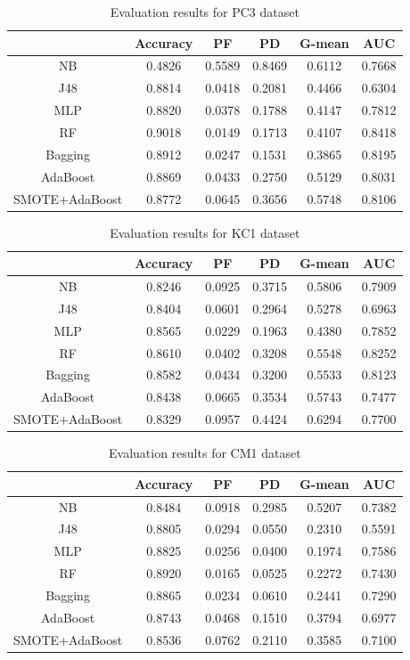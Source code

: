 \documentclass[runningheads,a4paper]{llncs}
\begin{document}
\begin{table}


\caption{Evaluation results for PC3 dataset}


\begin{centering}
\begin{tabular}{|c|c|c|c|c|c|}
\hline 
 & Accuracy & PF & PD & G-mean & AUC\tabularnewline
\hline 
\hline 
NB & 0.4826 & 0.5589 & 0.8469 & 0.6112 & 0.7668\tabularnewline
\hline 
J48 & 0.8814 & 0.0418 & 0.2081 & 0.4466 & 0.6304\tabularnewline
\hline 
MLP & 0.8820 & 0.0378 & 0.1788 & 0.4147 & 0.7812\tabularnewline
\hline 
RF & 0.9018 & 0.0149 & 0.1713 & 0.4107 & 0.8418\tabularnewline
\hline 
Bagging & 0.8912 & 0.0247 & 0.1531 & 0.3865 & 0.8195\tabularnewline
\hline 
AdaBoost & 0.8869 & 0.0433 & 0.2750 & 0.5129 & 0.8031\tabularnewline
\hline 
SMOTE+AdaBoost & 0.8772 & 0.0645 & 0.3656 & 0.5748 & 0.8106\tabularnewline
\hline 
\end{tabular}
\par\end{centering}
\end{table}


\begin{table}
\caption{Evaluation results for KC1 dataset}
\begin{centering}
\begin{tabular}{|c|c|c|c|c|c|}
\hline 
 & Accuracy & PF & PD & G-mean & AUC\tabularnewline
\hline 
\hline 
NB & 0.8246 & 0.0925 & 0.3715 & 0.5806 & 0.7909\tabularnewline
\hline 
J48 & 0.8404 & 0.0601 & 0.2964 & 0.5278 & 0.6963\tabularnewline
\hline 
MLP & 0.8565 & 0.0229 & 0.1963 & 0.4380 & 0.7852\tabularnewline
\hline 
RF & 0.8610 & 0.0402 & 0.3208 & 0.5548 & 0.8252\tabularnewline
\hline 
Bagging & 0.8582 & 0.0434 & 0.3200 & 0.5533 & 0.8123\tabularnewline
\hline 
AdaBoost & 0.8438 & 0.0665 & 0.3534 & 0.5743 & 0.7477\tabularnewline
\hline 
SMOTE+AdaBoost & 0.8329 & 0.0957 & 0.4424 & 0.6294 & 0.7700\tabularnewline
\hline 
\end{tabular}
\par\end{centering}
\end{table}


\begin{table}
\caption{Evaluation results for CM1 dataset}
\begin{centering}
\begin{tabular}{|c|c|c|c|c|c|}
\hline 
 & Accuracy & PF & PD & G-mean & AUC\tabularnewline
\hline 
\hline 
NB & 0.8484 & 0.0918 & 0.2985 & 0.5207 & 0.7382\tabularnewline
\hline 
J48 & 0.8805 & 0.0294 & 0.0550 & 0.2310 & 0.5591\tabularnewline
\hline 
MLP & 0.8825 & 0.0256 & 0.0400 & 0.1974 & 0.7586\tabularnewline
\hline 
RF & 0.8920 & 0.0165 & 0.0525 & 0.2272 & 0.7430\tabularnewline
\hline 
Bagging & 0.8865 & 0.0234 & 0.0610 & 0.2441 & 0.7290\tabularnewline
\hline 
AdaBoost & 0.8743 & 0.0468 & 0.1510 & 0.3794 & 0.6977\tabularnewline
\hline 
SMOTE+AdaBoost & 0.8536 & 0.0762 & 0.2110 & 0.3585 & 0.7100\tabularnewline
\hline 
\end{tabular}
\par\end{centering}
\end{table}
\end{document}
